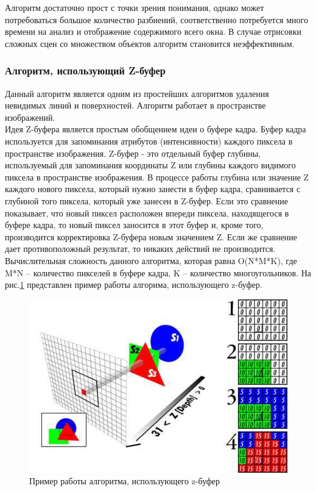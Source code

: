 \documentclass[54pt, a4paper]{article}
\begin{document}
	Алгоритм достаточно прост с точки зрения понимания, однако может потребоваться большое количество разбиений, соответственно потребуется много времени на анализ и отображение содержимого всего окна. В случае отрисовки сложных сцен со множеством объектов алгоритм становится неэффективным.
	\subsubsection{Алгоритм, использующий Z-буфер}
	Данный алгоритм является одним из простейших алгоритмов удаления невидимых линий и поверхностей. Алгоритм работает в пространстве изображений.\\
	
	Идея Z-буфера является простым обобщением идеи о буфере кадра. Буфер кадра используется для запоминания атрибутов (интенсивности) каждого пиксела в пространстве изображения. Z-буфер - это отдельный буфер глубины, используемый для запоминания координаты Z или глубины каждого видимого пиксела в пространстве изображения. В процессе работы глубина или значение Z каждого нового пиксела, который нужно занести в буфер кадра, сравнивается с глубиной того пиксела, который уже занесен в Z-буфер. Если это сравнение показывает, что новый пиксел расположен впереди пиксела, находящегося в буфере кадра, то новый пиксел заносится в этот буфер и, кроме того, производится корректировка Z-буфера новым значением Z. Если же сравнение дает противоположный результат, то никаких действий не производится. Вычислительная сложность данного алгоритма, которая равна O(N*M*K), где M*N – количество пикселей в буфере кадра, K – количество многоугольников. На рис.\ref{ris:zbuffer} представлен пример работы алгорима, использующего z-буфер.\\
	\begin{figure}[ht!]
		\centering
		\includegraphics[scale=0.7]{img/zbuffer.jpg}
		\caption{Пример работы алгоритма, использующего z-буфер}
		\label{ris:zbuffer}
	\end{figure}
	
\end{document}
